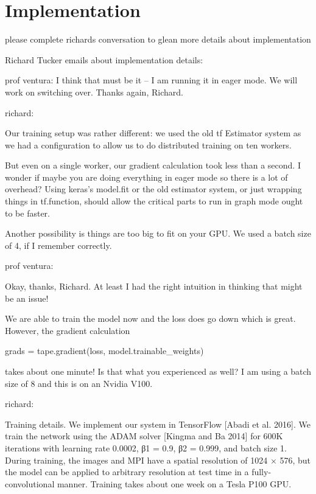 \section{Implementation}\label{sec3:implementation} 


please complete richards conversation to glean more details about implementation

Richard Tucker emails about implementation details:

prof ventura:
I think that must be it – I am running it in eager mode.  We will work on switching over.  Thanks again, Richard.


richard:

Our training setup was rather different: we used the old tf Estimator system as we had a configuration to allow us to do distributed training on ten workers.

 

But even on a single worker, our gradient calculation took less than a second. I wonder if maybe you are doing everything in eager mode so there is a lot of overhead? Using keras's model.fit or the old estimator system, or just wrapping things in tf.function, should allow the critical parts to run in graph mode ought to be faster.

Another possibility is things are too big to fit on your GPU. We used a batch size of 4, if I remember correctly.


prof ventura:

Okay, thanks, Richard.  At least I had the right intuition in thinking that might be an issue!

 

We are able to train the model now and the loss does go down which is great.  However, the gradient calculation

 

grads = tape.gradient(loss, model.trainable_weights)

 

takes about one minute!  Is that what you experienced as well?  I am using a batch size of 8 and this is on an Nvidia V100.


richard:




Training details. We implement our system in TensorFlow [Abadi
et al. 2016]. We train the network using the ADAM solver [Kingma
and Ba 2014] for 600K iterations with learning rate 0.0002, β1 =
0.9, β2 = 0.999, and batch size 1. During training, the images and
MPI have a spatial resolution of 1024 × 576, but the model can be
applied to arbitrary resolution at test time in a fully-convolutional
manner. Training takes about one week on a Tesla P100 GPU.

